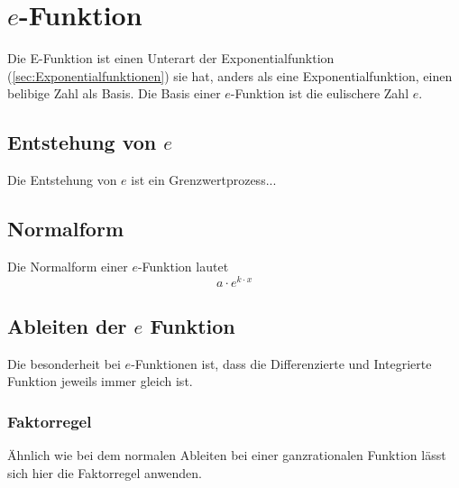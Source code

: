 \pagebreak
\section{$e$-Funktion}\label{sec:e-Funktion}
Die E-Funktion ist einen Unterart der Exponentialfunktion (\ref{sec:Exponentialfunktionen}) sie hat, anders als eine Exponentialfunktion, einen belibige Zahl als Basis. Die Basis einer $e$-Funktion ist die eulischere Zahl $e$. 
\subsection{Entstehung von $e$} \label{sec:E-Funktion/Entstehung von e}
Die Entstehung von $e$ ist ein Grenzwertprozess...

\subsection{Normalform}\label{sec:E-Funktion/Normalform}
Die Normalform einer $e$-Funktion lautet
\[a\cdot e^{k\cdot x}\]

\subsection{Ableiten der $e$ Funktion}\label{sec:E-Funktion/Ableiten der e Funktion}
Die besonderheit bei $e$-Funktionen ist, dass die Differenzierte und Integrierte Funktion jeweils immer gleich ist. 
\subsubsection{Faktorregel}\label{sec:E-Funktion/Normalform} 
Ähnlich wie bei dem normalen Ableiten bei einer ganzrationalen Funktion lässt sich hier die Faktorregel anwenden.
